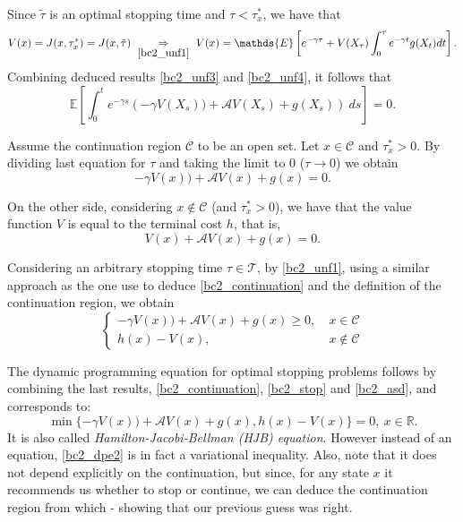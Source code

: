 Since $\tilde{\tau}$ is an optimal stopping time and $\tau< \tau^*_x$, we have that \begin{equation}
V(x)=J(x,\tau^*_x)=J(x,\tilde{\tau}) \  \underset{\eqref{bc2_unf1}}{\Rightarrow} \  V(x)=\mathds{E} \left[e^{-\gamma \tau} + V(X_\tau) \int^\tau_0 e^{-\gamma t}g(X_t)dt \right].
\label{bc2_unf4}
\end{equation} 
Combining deduced results \eqref{bc2_unf3} and \eqref{bc2_unf4}, it follows that
$$\mathds{E} \left[ \int^t_0  e^{-\gamma s} \left( - \gamma V(X_s))+\mathcal{A}V(X_s)+g(X_s) \right) \ ds \right]=0.$$

Assume the continuation region $\mathcal{C}$ to be an open set. Let $x\in \mathcal{C}$ and $\tau_x^*>0$. By dividing last equation for $\tau$ and taking the limit to 0 ($\tau \rightarrow 0$) we obtain
\begin{equation}
- \gamma V(x))+\mathcal{A}V(x)+g(x)=0.
\label{bc2_continuation}
\end{equation}

On the other side, considering $x\notin \mathcal{C}$ (and $\tau_x^*>0$), we have that the value function $V$ is equal to the terminal cost $h$, that is,
\begin{equation}
 V(x)+\mathcal{A}V(x)+g(x)=0.
\label{bc2_stop}
\end{equation}

Considering an arbitrary stopping time $\tau \in \mathcal{T}$, by \eqref{bc2_unf1}, using a similar approach as the one use to deduce \eqref{bc2_continuation} and the definition of the continuation region, we obtain 
\begin{equation}
	\begin{cases}
	- \gamma V(x))+\mathcal{A}V(x)+g(x) \geq 0, \ &x \in \mathcal{C}\\
	h(x)-V(x), \ &x \notin \mathcal{C}
	\end{cases}
	\label{bc2_asd}
\end{equation}

The dynamic programming equation for optimal stopping problems follows by combining the last results, \eqref{bc2_continuation}, \eqref{bc2_stop} and \eqref{bc2_asd}, and corresponds to:
\begin{equation}
\min \{ - \gamma V(x))+\mathcal{A}V(x)+g(x), h(x)-V(x)\}=0, \ x\in \mathds{R}.
\label{bc2_dpe2}
\end{equation}
It is also called \textit{Hamilton-Jacobi-Bellman (HJB) equation}. However instead of an equation, \eqref{bc2_dpe2} is in fact a variational inequality. Also, note that it does not depend explicitly on the continuation, but since, for any state $x$ it recommends us whether to stop or continue, we can deduce the continuation region from which - showing that our previous guess was right.

